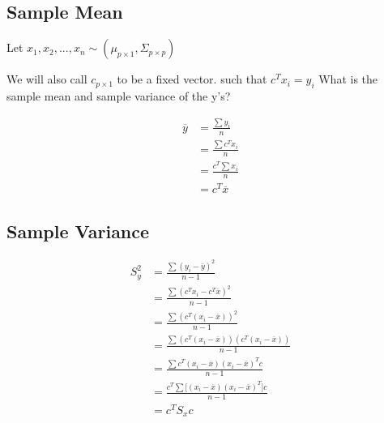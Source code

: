 \subsection{Sample Mean}
Let $x_1,x_2,...,x_n \sim (\mu_{p\times 1}, \Sigma_{p\times p})$

We will also call $c_{p\times1}$ to be a fixed vector. such that $c^Tx_i = y_i$
What is the sample mean and sample variance of the y's?

\begin{align*}
    \overline{y} &=\frac{\sum y_i}{n}\\
    &=\frac{\sum c^Tx_i}{n}\\
    &=\frac{c^T \sum x_i}{n}\\
    &= c^T\overline{x}
\end{align*}

\subsection{Sample Variance}

\begin{align*}
    S_y^2 &= \frac{\sum(y_i-\overline{y})^2}{n-1} \\
    &= \frac{\sum(c^
    Tx_i-c^T\overline{x})^2}{n-1}\\
    &=\frac{\sum(c^T(x_i-\overline{x}))^2}{n-1}\\
    &=\frac{\sum(c^T(x_i-\overline{x}))(c^T(x_i-\overline{x}))}{n-1}\\
    &=\frac{\sum c^T(x_i-\overline{x})(x_i-\overline{x})^Tc}{n-1}\\
    &=\frac{ c^T\sum \big[(x_i-\overline{x})(x_i-\overline{x})^T\big]c}{n-1} \\
    &= c^TS_xc
\end{align*}